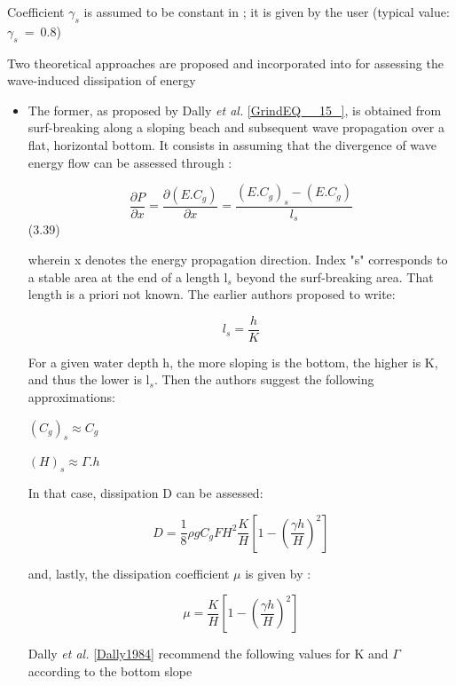 Coefficient $\gamma_{s}$ is assumed to be constant in \artemis{}; it is given
by the user (typical value: $\gamma_{s}$~=~0.8)

Two theoretical approaches are proposed and incorporated into \artemis{} for assessing the wave-induced dissipation of energy

\begin{itemize}
\item  The former, as proposed by Dally \textit{et al.} \eqref{GrindEQ__15_}, is obtained from surf-breaking along a sloping beach and subsequent wave propagation over a flat, horizontal bottom. It consists in assuming that the divergence of wave energy flow can be assessed through :

\begin{equation}
  \frac{\partial P}{\partial x} = \frac{\partial(E.C_{g})}{\partial x} = \frac{(E.C_{g})_{s}-(E.C_{g})}{l_{s}}
  \label{eq:3.39}
\end{equation}
   (3.39)

wherein x denotes the energy propagation direction. Index "s" corresponds to a
    stable area at the end of a length l${}_{s}$ beyond the surf-breaking area.
    That length is a priori not known. The earlier authors proposed to write:

    \[ l_{s} = \frac{h}{K}\]

For a given water depth h, the more sloping is the bottom, the higher is K, and
    thus the lower is l${}_{s}$. Then the authors suggest the following
    approximations:

    $(C_{g})_{s} \approx C_{g} $

    $(H)_{s} \approx \Gamma.h$

In that case, dissipation D can be assessed:

    \begin{equation}
      D = \frac{1}{8}\rho gC_{g}FH^{2}\frac{K}{H}\left[1-\left(\frac{\gamma h}{H}\right)^{2}\right]
      \label{eq:3.40}
    \end{equation}

and, lastly, the dissipation coefficient $\mu$ is given by :

    \begin{equation}
      \mu = \frac{K}{H}\left[1-\left(\frac{\gamma h}{H}\right)^{2}\right]
      \label{eq:3.41}
    \end{equation}

Dally \textit{et al.} \eqref{Dally1984} recommend the following values for K
    and $\Gamma$ according to the bottom slope


\end{itemize}
